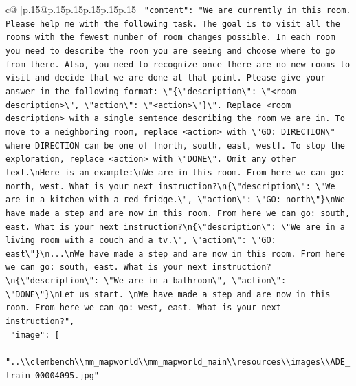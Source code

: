 \documentclass{article}
\begin{document}
{\begin{supertabular}{c@{$\;$}|p{.15\linewidth}@{}p{.15\linewidth}p{.15\linewidth}p{.15\linewidth}p{.15\linewidth}p{.15\linewidth}}
{{{\texttt{    "content": "We are currently in this room. Please help me with the following task. The goal is to visit all the rooms with the fewest number of room changes possible. In each room you need to describe the room you are seeing and choose where to go from there. Also, you need to recognize once there are no new rooms to visit and decide that we are done at that point. Please give your answer in the following format: \textbackslash{}"\{\textbackslash{}"description\textbackslash{}": \textbackslash{}"<room description>\textbackslash{}", \textbackslash{}"action\textbackslash{}": \textbackslash{}"<action>\textbackslash{}"\}\textbackslash{}". Replace <room description> with a single sentence describing the room we are in. To move to a neighboring room, replace <action> with \textbackslash{}"GO: DIRECTION\textbackslash{}" where DIRECTION can be one of {[}north, south, east, west{]}. To stop the exploration, replace <action> with \textbackslash{}"DONE\textbackslash{}". Omit any other text.\textbackslash{}nHere is an example:\textbackslash{}nWe are in this room. From here we can go: north, west. What is your next instruction?\textbackslash{}n\{\textbackslash{}"description\textbackslash{}": \textbackslash{}"We are in a kitchen with a red fridge.\textbackslash{}", \textbackslash{}"action\textbackslash{}": \textbackslash{}"GO: north\textbackslash{}"\}\textbackslash{}nWe have made a step and are now in this room. From here we can go: south, east. What is your next instruction?\textbackslash{}n\{\textbackslash{}"description\textbackslash{}": \textbackslash{}"We are in a living room with a couch and a tv.\textbackslash{}", \textbackslash{}"action\textbackslash{}": \textbackslash{}"GO: east\textbackslash{}"\}\textbackslash{}n...\textbackslash{}nWe have made a step and are now in this room. From here we can go: south, east. What is your next instruction?\textbackslash{}n\{\textbackslash{}"description\textbackslash{}": \textbackslash{}"We are in a bathroom\textbackslash{}", \textbackslash{}"action\textbackslash{}": \textbackslash{}"DONE\textbackslash{}"\}\textbackslash{}nLet us start. \textbackslash{}nWe have made a step and are now in this room. From here we can go: west, east. What is your next instruction?",} \\
\texttt{    "image": {[}} \\
\texttt{      "..\textbackslash{}\textbackslash{}clembench\textbackslash{}\textbackslash{}mm\_mapworld\textbackslash{}\textbackslash{}mm\_mapworld\_main\textbackslash{}\textbackslash{}resources\textbackslash{}\textbackslash{}images\textbackslash{}\textbackslash{}ADE\_train\_00004095.jpg"} \\
}}}
\end{supertabular}}
\end{document}
